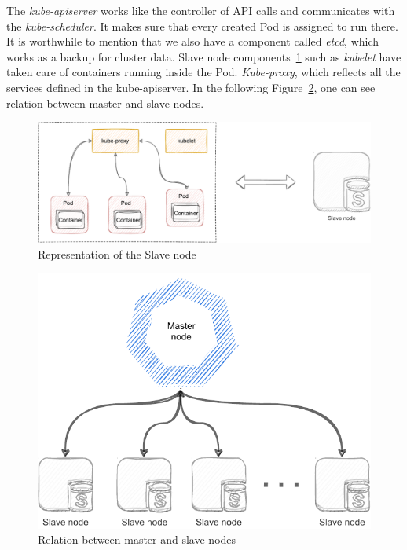 The \emph{kube-apiserver} works like the controller of API calls and communicates with the \emph{kube-scheduler}.
It makes sure that every created Pod is assigned to run there.
It is worthwhile to mention that we also have a component called \emph{etcd}, which works as a backup for cluster data.
Slave node components~\ref{02:fig:slaveNode} such as \emph{kubelet} have taken care of containers running inside the Pod. \emph{Kube-proxy}, which reflects all the services defined in the kube-apiserver.
In the following Figure~\ref{02:fig:masterAndSlaveNode}, one can see relation between master and slave nodes.

\begin{figure}[!h]
    \centering
    \includegraphics[scale=0.82]{obrazky-figures/02-preliminaries/01-kubernetes/02-architecture-slave-sketch}
    \caption{Representation of the Slave node}
    \label{02:fig:slaveNode}
\end{figure}


\begin{figure}[!h]
    \centering
    \includegraphics[scale=0.92]{obrazky-figures/02-preliminaries/01-kubernetes/02-final-architecture-master-slave}
    \caption{Relation between master and slave nodes}
    \label{02:fig:masterAndSlaveNode}
\end{figure}

